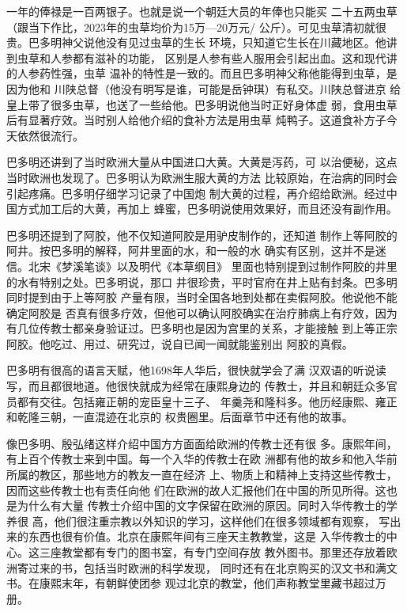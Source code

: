一年的俸禄是一百两银子。也就是说一个朝廷大员的年俸也只能买%
二十五两虫草（跟当下作比，2023年的虫草均价为15万—20万元/%
公斤）。可见虫草清初就很贵。巴多明神父说他没有见过虫草的生长%
环境，只知道它生长在川藏地区。他讲到虫草和人参都有滋补的功能，%
区别是人参有些人服用会引起出血。这和现代讲的人参药性强，虫草%
温补的特性是一致的。而且巴多明神父称他能得到虫草，是因为他和%
川陕总督（他没有明写是谁，可能是岳钟琪）有私交。川陕总督进京%
给皇上带了很多虫草，也送了一些给他。巴多明说他当时正好身体虚%
弱，食用虫草后有显著疗效。当时别人给他介绍的食补方法是用虫草%
炖鸭子。这道食补方子今天依然很流行。%
\par
巴多明还讲到了当时欧洲大量从中国进口大黄。大黄是泻药，可%
以治便秘，这点当时欧洲也发现了。巴多明认为欧洲生服大黄的方法%
比较原始，在治病的同时会引起疼痛。巴多明仔细学习记录了中国炮%
制大黄的过程，再介绍给欧洲。经过中国方式加工后的大黄，再加上%
蜂蜜，巴多明说使用效果好，而且还没有副作用。%
\par
巴多明还提到了阿胶，他不仅知道阿胶是用驴皮制作的，还知道%
制作上等阿胶的阿井。按巴多明的解释，阿井里面的水，和一般的水%
确实有区别，这并不是迷信。北宋《梦溪笔谈》以及明代《本草纲目》%
里面也特别提到过制作阿胶的井里的水有特别之处。巴多明说，那口%
井很珍贵，平时官府在井上贴有封条。巴多明同时提到由于上等阿胶%
产量有限，当时全国各地到处都在卖假阿胶。他说他不能确定阿胶是%
否真有很多疗效，但他可以确认阿胶确实在治疗肺病上有疗效，因为%
有几位传教士都亲身验证过。巴多明也是因为宫里的关系，才能接触%
到上等正宗阿胶。他吃过、用过、研究过，说自已闻一闻就能鉴别出%
阿胶的真假。%
\par
巴多明有很高的语言天赋，他1698年人华后，很快就学会了满%
汉双语的听说读写，而且都很地道。他很快就成为经常在康熙身边的%
传教士，并且和朝廷众多官员都有交往。包括雍正朝的宠臣皇十三子、%
年羹尧和隆科多。他历经康熙、雍正和乾隆三朝，一直混迹在北京的%
权贵圈里。后面章节中还有他的故事。%
\par
像巴多明、殷弘绪这样介绍中国方方面面给欧洲的传教士还有很%
多。康熙年间，有上百个传教士来到中国。每一个入华的传教士在欧%
洲都有他的故乡和他入华前所属的教区，那些地方的教友一直在经济%
上、物质上和精神上支持这些传教士，因而这些传教士也有责任向他%
们在欧洲的故人汇报他们在中国的所见所得。这也是为什么有大量%
传教士介绍中国的文字保留在欧洲的原因。同时入华传教士的学养很%
高，他们很注重宗教以外知识的学习，这样他们在很多领域都有观察，%
写出来的东西也很有价值。北京在康熙年间有三座天主教教堂，这是%
入华传教士的中心。这三座教堂都有专门的图书室，有专门空间存放%
教外图书。那里还存放着欧洲寄过来的书，包括当时欧洲的科学发现，%
同时还有在北京购买的汉文书和满文书。在康熙末年，有朝鲜使团参%
观过北京的教堂，他们声称教堂里藏书超过万册。%
